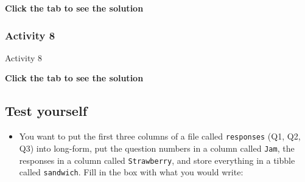 \documentclass[]{book}
\newenvironment{Shaded}{\begin{snugshade}}{\end{snugshade}}
\newcommand{\CommentTok}[1]{\textcolor[rgb]{0.56,0.35,0.01}{\textit{#1}}}
\newcommand{\DataTypeTok}[1]{\textcolor[rgb]{0.13,0.29,0.53}{#1}}
\newcommand{\KeywordTok}[1]{\textcolor[rgb]{0.13,0.29,0.53}{\textbf{#1}}}
\newcommand{\NormalTok}[1]{#1}
\newcommand{\OperatorTok}[1]{\textcolor[rgb]{0.81,0.36,0.00}{\textbf{#1}}}
\newcommand{\StringTok}[1]{\textcolor[rgb]{0.31,0.60,0.02}{#1}}
\providecommand{\tightlist}{%
  \setlength{\itemsep}{0pt}\setlength{\parskip}{0pt}}
\begin{document}
\textbf{Click the tab to see the solution}

\hypertarget{activity-8-1}{%
\subsubsection{Activity 8}\label{activity-8-1}}

Activity 8

\begin{Shaded}
\end{Shaded}

\textbf{Click the tab to see the solution}

\hypertarget{test-yourself-3}{%
\subsection{Test yourself}\label{test-yourself-3}}

\begin{itemize}
\tightlist
\item
  You want to put the first three columns of a file called \texttt{responses} (Q1, Q2, Q3) into long-form, put the question numbers in a column called \texttt{Jam}, the responses in a column called \texttt{Strawberry}, and store everything in a tibble called \texttt{sandwich}. Fill in the box with what you would write: 
\end{itemize}
\end{document}
